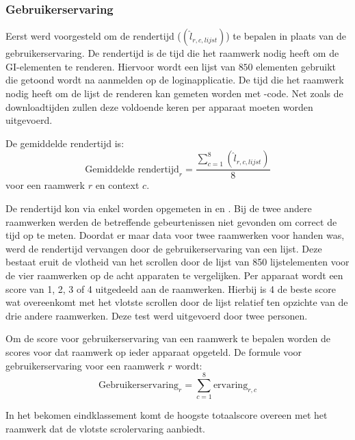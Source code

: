 \subsubsection{Gebruikerservaring}
Eerst werd voorgesteld om de rendertijd ($\left(\widehat{l}_{r,c,lijst}\right)$) te bepalen in plaats van de gebruikerservaring.
De rendertijd is de tijd die het raamwerk nodig heeft om de GI-elementen te renderen.
Hiervoor wordt een lijst van $850$ elementen gebruikt die getoond wordt na aanmelden op de loginapplicatie.
De tijd die het raamwerk nodig heeft om de lijst de renderen kan gemeten worden met \js-code.
Net zoals de downloadtijden zullen deze voldoende keren per apparaat moeten worden uitgevoerd.

De gemiddelde rendertijd is:
\begin{equation}
 \text{Gemiddelde rendertijd}_r= \frac{\sum\limits_{c=1}^{8}{\left(\widehat{l}_{r,c,lijst}\right)}}{8}
 \label{eq:totale-gebruikerservaring}
\end{equation}
voor een raamwerk $r$ en context $c$.

De rendertijd kon via \js{} enkel worden opgemeten in \jqm{} en \kendo{}.
Bij de twee andere raamwerken werden de betreffende gebeurtenissen niet gevonden om correct de tijd op te meten.
Doordat er maar data voor twee raamwerken voor handen was, werd de rendertijd vervangen door de gebruikerservaring van een lijst.
Deze bestaat eruit de vlotheid van het scrollen door de lijst van 850 lijstelementen voor de vier raamwerken op de acht apparaten te vergelijken.
Per apparaat wordt een score van 1, 2, 3 of 4 uitgedeeld aan de raamwerken.
Hierbij is 4 de beste score wat overeenkomt met het vlotste scrollen door de lijst relatief ten opzichte van de drie andere raamwerken.
Deze test werd uitgevoerd door twee personen.

Om de score voor gebruikerservaring van een raamwerk te bepalen worden de scores voor dat raamwerk op ieder apparaat opgeteld. De formule voor gebruikerservaring voor een raamwerk $r$ wordt:
\begin{equation}
  \text{Gebruikerservaring}_r = \sum_{c=1}^{8}{\text{ervaring}_{r,c}}
  \label{eq:performantie-gebruikservaring}
\end{equation}

In het bekomen eindklassement komt de hoogste totaalscore overeen met het raamwerk dat de vlotste scrolervaring aanbiedt. 

